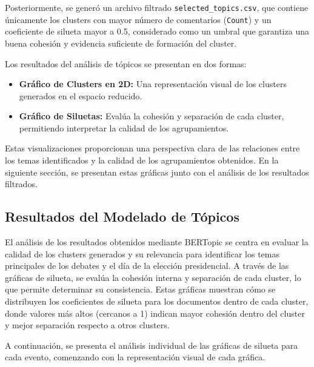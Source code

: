 \documentclass[10pt, a4paper]{article}
\begin{document}
	Posteriormente, se generó un archivo filtrado \texttt{selected\_topics.csv}, que contiene únicamente los clusters con mayor número de comentarios (\texttt{Count}) y un coeficiente de silueta mayor a 0.5, considerado como un umbral que garantiza una buena cohesión y evidencia suficiente de formación del cluster.

	Los resultados del análisis de tópicos se presentan en dos formas:
	\begin{itemize}
		\item \textbf{Gráfico de Clusters en 2D:} Una representación visual de los clusters generados en el espacio reducido.
		\item \textbf{Gráfico de Siluetas:} Evalúa la cohesión y separación de cada cluster, permitiendo interpretar la calidad de los agrupamientos.
	\end{itemize}
	
	Estas visualizaciones proporcionan una perspectiva clara de las relaciones entre los temas identificados y la calidad de los agrupamientos obtenidos. En la siguiente sección, se presentan estas gráficas junto con el análisis de los resultados filtrados.
	
	\subsection{Resultados del Modelado de Tópicos}
	
	El análisis de los resultados obtenidos mediante BERTopic se centra en evaluar la calidad de los clusters generados y su relevancia para identificar los temas principales de los debates y el día de la elección presidencial. A través de las gráficas de silueta, se evalúa la cohesión interna y separación de cada cluster, lo que permite determinar su consistencia. Estas gráficas muestran cómo se distribuyen los coeficientes de silueta para los documentos dentro de cada cluster, donde valores más altos (cercanos a 1) indican mayor cohesión dentro del cluster y mejor separación respecto a otros clusters.
	
	A continuación, se presenta el análisis individual de las gráficas de silueta para cada evento, comenzando con la representación visual de cada gráfica.
	
\end{document}
